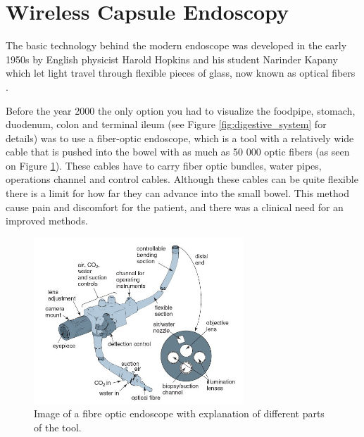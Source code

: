 \documentclass[english, a4paper]{article}
\begin{document}


\section{Wireless Capsule Endoscopy}  \label{wireless_capsule_endoscopy}
The basic technology behind the modern endoscope was developed in the early 1950s by English physicist Harold Hopkins and his student Narinder Kapany which let light travel through flexible pieces of glass, now known as optical fibers \cite{NewMethod54}.

Before the year 2000 the only option you had to visualize the foodpipe, stomach, duodenum, colon and terminal ileum (see Figure \ref{fig:digestive_system} for details) was to use a fiber-optic endoscope, which is a tool with a relatively wide cable that is pushed into the bowel with as much as 50 000 optic fibers (as seen on Figure \ref{fig:fiber-optic-endoscopy}). These cables have to carry fiber optic bundles, water pipes, operations channel and control cables. Although these cables can be quite flexible there is a limit for how far they can advance into the small bowel. This method cause pain and discomfort for the patient, and there was a clinical need for an improved methods.

\begin{figure} %
  \begin{center}
    \includegraphics[width=0.7\textwidth]{fiber-optic-endoscope.jpg}
    \caption[Image]{Image of a fibre optic endoscope with explanation of different parts of the tool\footnotemark.}
    \label{fig:fiber-optic-endoscopy}
  \end{center}
\end{figure}
\end{document}
